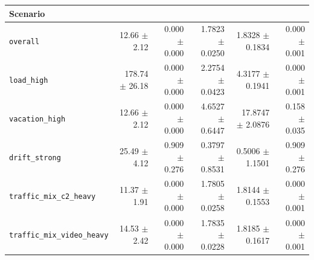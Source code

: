 \begin{tabular}{lrrrrr}
\hline
Scenario &
 &
 &
 &
 &
 \\
\hline
\texttt{overall} & 12.66 $\pm$ 2.12 & 0.000 $\pm$ 0.000 & 1.7823 $\pm$ 0.0250 & 1.8328 $\pm$ 0.1834 & 0.000 $\pm$ 0.001 \\
\texttt{load\_high} & 178.74 $\pm$ 26.18 & 0.000 $\pm$ 0.000 & 2.2754 $\pm$ 0.0423 & 4.3177 $\pm$ 0.1941 & 0.000 $\pm$ 0.001 \\
\texttt{vacation\_high} & 12.66 $\pm$ 2.12 & 0.000 $\pm$ 0.000 & 4.6527 $\pm$ 0.6447 & 17.8747 $\pm$ 2.0876 & 0.158 $\pm$ 0.035 \\
\texttt{drift\_strong} & 25.49 $\pm$ 4.12 & 0.909 $\pm$ 0.276 & 0.3797 $\pm$ 0.8531 & 0.5006 $\pm$ 1.1501 & 0.909 $\pm$ 0.276 \\
\texttt{traffic\_mix\_c2\_heavy} & 11.37 $\pm$ 1.91 & 0.000 $\pm$ 0.000 & 1.7805 $\pm$ 0.0258 & 1.8144 $\pm$ 0.1553 & 0.000 $\pm$ 0.001 \\
\texttt{traffic\_mix\_video\_heavy} & 14.53 $\pm$ 2.42 & 0.000 $\pm$ 0.000 & 1.7835 $\pm$ 0.0228 & 1.8185 $\pm$ 0.1617 & 0.000 $\pm$ 0.001 \\
\hline
\end{tabular}
